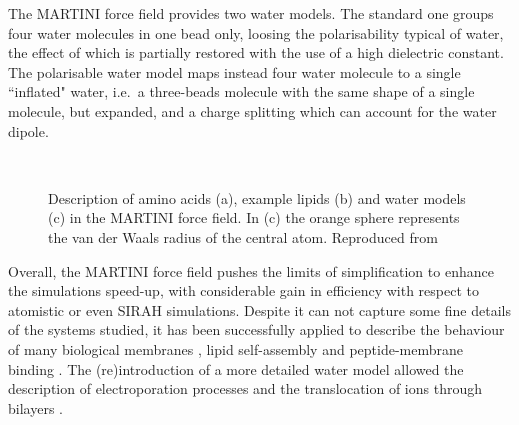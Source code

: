 The MARTINI force field provides two water models. The standard one groups four water molecules in one bead only, loosing the polarisability typical of water, the effect of which is partially restored with the use of a high dielectric constant. The polarisable water model \citep{Yesylevskyy2010} maps instead four water molecule to a single ``inflated" water, i.e.\ a three-beads molecule with the same shape of a single molecule, but expanded, and a charge splitting which can account for the water dipole.
%
\begin{figure}[t!]
\centering
{} \\
%
\caption[MARTINI force field mapping for amino acids, lipids and water]{Description of amino acids (a), example lipids (b) and water models (c) in the MARTINI force field. In (c) the orange sphere represents the van der Waals radius of the central atom. Reproduced from \citet{Monticelli2008,calgary_site,Yesylevskyy2010}}
\label{fig:martini}
\end{figure}
%
Overall, the MARTINI force field pushes the limits of simplification to enhance the simulations speed-up, with considerable gain in efficiency with respect to atomistic or even SIRAH simulations. Despite it can not capture some fine details of the systems studied, it has been successfully applied to describe the behaviour of many biological membranes \citep{Khalid2019,Samsudin2017}, lipid self-assembly \citep{Marrink2007} and peptide-membrane binding \citep{Song2019}. The (re)introduction of a more detailed water model allowed the description of electroporation processes and the translocation of ions through bilayers \citep{Yesylevskyy2010}.

